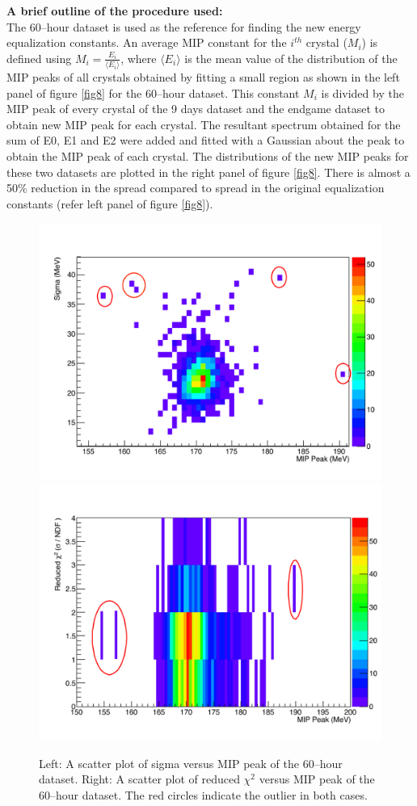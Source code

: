 \documentclass[article,accept,moreauthors,pdftex,10pt,a4paper]{../MDPI_template/Definitions/mdpi}
\begin{document}
\noindent \textbf{A brief outline of the procedure used:}\\
The 60--hour dataset is used as the reference for finding the new energy equalization constants. 
An average MIP constant for the $i^{th}$ crystal ($M_i$) is defined using $ M_i = \frac {E_i}{\langle {E_i}\rangle}$, 
where $\langle {E_i}\rangle$ is the mean value of the distribution of the MIP peaks of all crystals obtained by fitting 
a small region as shown in the left panel of figure \ref{fig8} for the 60--hour dataset. 
This constant $M_i$ is divided by the MIP peak of every crystal of the 9 days dataset and the endgame dataset 
to obtain new MIP peak for each crystal. The resultant spectrum obtained for the sum of E0, E1 and E2 were 
added and fitted with a Gaussian about the peak to obtain the MIP peak of each crystal. 
The distributions of the new MIP peaks for these two datasets are plotted in the right panel of figure \ref{fig8}. There is almost a 
50\% reduction in the spread compared to spread in the original equalization constants (refer left panel of figure \ref{fig8}).  
\begin{figure}[H]
\centering
\includegraphics[width=7 cm]{sigma_mip.pdf}
\includegraphics[width=7 cm]{chi2_mip.pdf}
\caption{\label{fig9}Left: A scatter plot of sigma versus MIP peak of the 60--hour dataset.
Right: A scatter plot of reduced $\chi^2$ versus MIP peak of the 60--hour dataset. The red circles indicate the outlier in both cases.}
\end{figure}  
\end{document}
